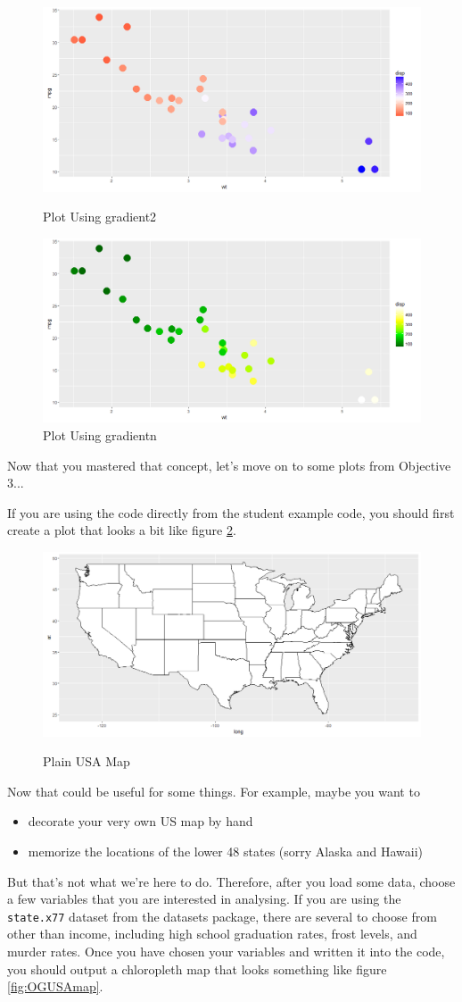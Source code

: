 \begin{figure}[htbp!]
\centering
\begin{minipage}{.5\textwidth}
  \centering
  \includegraphics[width=.25\textwidth]{pictures/ggplot2/contscattermidpoint.png}
  \caption{Plot Using gradient2}
  \label{fig:contscattermidpoint}
\end{minipage}%
\begin{minipage}{.5\textwidth}
  \centering
  \includegraphics[width=.25\textwidth]{pictures/ggplot2/contscatter.png}
  \caption{Plot Using gradientn}
  \label{fig:contscatter}
\end{minipage}
\end{figure}

\noindent Now that you mastered that concept, let's move on to some plots from Objective 3...

\noindent If you are using the code directly from the student example code, you should first create a  plot that looks a bit like figure \ref{fig:plainUSAmap}.

\begin{figure}[htbp!]
   \centering
      \caption{Plain USA Map}
   \includegraphics[width=.5\textwidth]{pictures/ggplot2/plainUSAmap.png} 
   \label{fig:plainUSAmap}
\end{figure} 

\noindent Now that could be useful for some things.
For example, maybe you want to
\begin{itemize}
    \item decorate your very own US map by hand
    \item memorize the locations of the lower 48 states (sorry Alaska and Hawaii)
\end{itemize}
But that's not what we're here to do.
Therefore, after you load some data, choose a few variables that you are interested in analysing.
If you are using the \texttt{state.x77} dataset from the datasets package, there are several to choose from other than income, including high school graduation rates, frost levels, and murder rates.
Once you have chosen your variables and written it into the code, you should output a chloropleth map that looks something like figure \ref{fig:OGUSAmap}.

